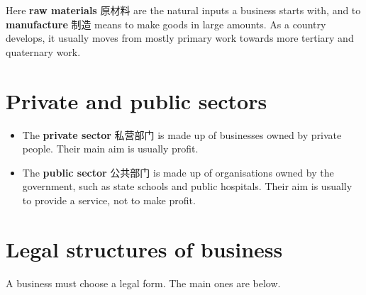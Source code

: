 \documentclass[11pt]{article}
\begin{document}
Here \textbf{raw materials} 原材料 are the natural inputs a business starts with, and to \textbf{manufacture} 制造 means to make goods in large amounts. As a country develops, it usually moves from mostly primary work towards more tertiary and quaternary work.

\section*{Private and public sectors}

\begin{itemize}
\item The \textbf{private sector} 私营部门 is made up of businesses owned by private people. Their main aim is usually profit.

\item The \textbf{public sector} 公共部门 is made up of organisations owned by the government, such as state schools and public hospitals. Their aim is usually to provide a service, not to make profit.

\end{itemize}

\section*{Legal structures of business}

A business must choose a legal form. The main ones are below.
\end{document}
